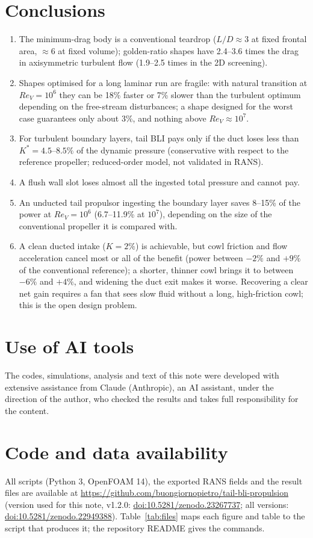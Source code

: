 \documentclass[11pt,a4paper]{article}
\newcommand{\ReV}{\mathit{Re}_V}
\begin{document}
\section{Conclusions}
\begin{enumerate}
\item The minimum-drag body is a conventional teardrop ($L/D\approx3$ at fixed frontal
area, $\approx6$ at fixed volume); golden-ratio shapes have 2.4--3.6 times the drag in
axisymmetric turbulent flow (1.9--2.5 times in the 2D screening).
\item Shapes optimised for a long laminar run are fragile: with natural transition at
$\ReV=10^6$ they can be 18\% faster or 7\% slower than the turbulent optimum depending
on the free-stream disturbances; a shape designed for the worst case guarantees only
about 3\%, and nothing above $\ReV\approx10^7$.
\item For turbulent boundary layers, tail BLI pays only if the duct loses less than
$K^*=4.5$--$8.5\%$ of the dynamic pressure (conservative with respect to the reference
propeller; reduced-order model, not validated in RANS).
\item A flush wall slot loses almost all the ingested total pressure and cannot pay.
\item An unducted tail propulsor ingesting the boundary layer saves 8--15\% of the power at
$\ReV=10^6$ (6.7--11.9\% at $10^7$), depending on the size of the conventional propeller it is
compared with.
\item A clean ducted intake ($K=2\%$) is achievable, but cowl friction and flow
acceleration cancel most or all of the benefit (power between $-2\%$ and $+9\%$ of the
conventional reference); a shorter, thinner cowl brings it to between $-6\%$ and $+4\%$,
and widening the duct exit makes it worse. Recovering a clear net gain requires a fan that
sees slow fluid without a long, high-friction cowl; this is the open design problem.
\end{enumerate}

\section*{Use of AI tools}
The codes, simulations, analysis and text of this note were developed with extensive
assistance from Claude (Anthropic), an AI assistant, under the direction of the author, who
checked the results and takes full responsibility for the content.

\section*{Code and data availability}
All scripts (Python 3, OpenFOAM 14), the exported RANS fields and the result files are
available at \url{https://github.com/buongiornopietro/tail-bli-propulsion}
(version used for this note, v1.2.0: \href{https://doi.org/10.5281/zenodo.23267737}{doi:10.5281/zenodo.23267737};
all versions: \href{https://doi.org/10.5281/zenodo.22949388}{doi:10.5281/zenodo.22949388}). Table~\ref{tab:files} maps each figure and
table to the script that produces it; the repository README gives the commands.
\end{document}
